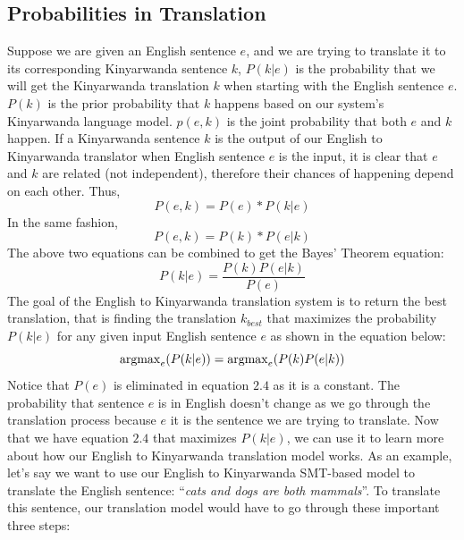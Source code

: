 \subsection{Probabilities in Translation}
Suppose we are given an English sentence $e$, and we are trying to translate it to its corresponding Kinyarwanda sentence $k$, $P(k|e)$ is the probability that we will get the Kinyarwanda translation $k$ when starting with the English sentence $e$. $P(k)$ is the prior probability that $k$ happens based on our system's Kinyarwanda language model. $p(e,k)$ is the joint probability that both $e$ and $k$ happen. If a Kinyarwanda sentence $k$ is the output of our English to Kinyarwanda translator when English sentence $e$ is the input, it is clear that $e$ and $k$ are related (not independent), therefore their chances of happening depend on each other. Thus,
\begin{equation}\label{zero1}
P(e,k) = P(e) * P(k|e)
\end{equation}
In the same fashion,
\begin{equation}\label{zero2}
P(e,k) = P(k) * P(e|k)
\end{equation}
The  above two equations can be combined to get the Bayes' Theorem equation:
\begin{equation}\label{one}
P(k|e) = \frac{P(k)P(e|k)}{P(e)}
\end{equation}
The goal of the English to Kinyarwanda translation system is to return the best translation, that is finding the translation $k_{best}$ that maximizes the probability $P(k|e)$ for any given input English sentence $e$ as shown in the equation below:
\begin{equation}
\mathop{\mathrm{argmax}}\nolimits_e(P(k|e)) = \mathop{\mathrm{argmax}}\nolimits_e(P(k)P(e|k))\\
\end{equation}
Notice that $P(e)$ is eliminated in equation $2.4$ as it is a constant. The probability that sentence $e$ is in English doesn't change as we go through the translation process because $e$ it is the sentence we are trying to translate. Now that we have equation $2.4$ that maximizes $P(k|e)$, we can use it to learn more about how our English to Kinyarwanda translation model works. As an example, let's say we want to use our English to Kinyarwanda SMT-based model to translate the English sentence: ``\textit{cats and dogs are both mammals}''. To translate this sentence, our translation model would have to go through these important three steps:

